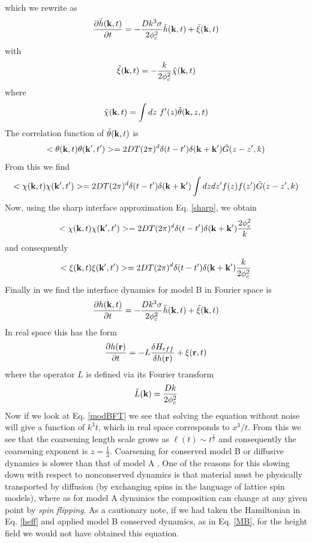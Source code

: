 which we rewrite as
\begin{equation}
\frac{\partial \tilde h({\bf k},t)}{\partial t} = -\frac{Dk^3\sigma}{2\phi_c^2} \tilde h({\bf k},t) + \tilde \xi({\bf k},t)
\end{equation}
with 
\begin{equation}
\tilde \xi({\bf k},t)= - \frac{k}{2\phi_c^2}\tilde \chi({\bf k},t)
\end{equation}
where 
\begin{equation}
\tilde \chi({\bf k},t)= \int dz\ f'(z) \tilde\theta({\bf k},z,t)
\end{equation}
The correlation function of $\tilde \theta({\bf k},t)$ is 
\begin{equation}
< \theta({\bf k},t)\theta({\bf k}',t')> = 2DT(2\pi)^d \delta(t-t') \delta({\bf k}+{\bf k'}) \tilde G(z-z',k)
\end{equation}
From this we find 
\begin{equation}
< \chi({\bf k},t)\chi({\bf k}',t')> = 2DT(2\pi)^d \delta(t-t') \delta({\bf k}+{\bf k'}) \int dz dz' f(z) f(z') \tilde G(z-z',k)
\label{bstep2}
\end{equation}
Now, using the sharp interface approximation Eq. \eqref{sharp}, we obtain
\begin{equation}
< \chi({\bf k},t)\chi({\bf k}',t')> = 2DT(2\pi)^d \delta(t-t') \delta({\bf k}+{\bf k'}) \frac{2\phi_c^2}{k}
\end{equation}
and consequently
\begin{equation}
< \xi({\bf k},t)\xi({\bf k}',t')> = 2DT(2\pi)^d \delta(t-t') \delta({\bf k}+{\bf k'}) \frac{k}{ 2\phi_c^2}
\end{equation}
Finally in we find the interface dynamics for model B in Fourier space is
\begin{equation}
\frac{\partial h({\bf k},t)}{\partial t} = -\frac{Dk^3\sigma}{2\phi_c^2} \tilde h({\bf k},t) + \tilde \xi({\bf k},t)
\label{modBFT}
\end{equation}
In real space this has the form
\begin{equation}
\frac{\partial h({\bf r})}{\partial t}= -L \frac{\delta H_{eff}}{\delta h ({\bf r})} + \xi({\bf r},t)
\end{equation}
where the operator $L$ is defined via its Fourier transform
\begin{equation}
\tilde L({\bf k}) = \frac{Dk}{2\phi_c^2}
\end{equation}
Now if we look at Eq. \eqref{modBFT} we see that solving the equation without noise will give a function of $k^3t$, which in real space corresponds to $x^3/t$. From this we see that the coarsening length scale grows as $\ell(t) \sim t^{\frac{1}{3}}$ and consequently the coarsening exponent is $z=\frac{1}{3}$. Coarsening for conserved model B or diffusive dynamics is slower than that of model A \cite{huse_corrections_1986}. One of the reasons for this slowing down with respect to nonconserved dynamics is that material must be physically transported by diffusion (by exchanging spins in the language of lattice spin models), where as for model A dynamics the composition can change at any given point by {\em spin flipping}. As a cautionary note, if we had taken the Hamiltonian in Eq. \eqref{heff} and applied model B conserved dynamics, as in Eq. \eqref{MB}, for the height field we would not have obtained this equation. 

